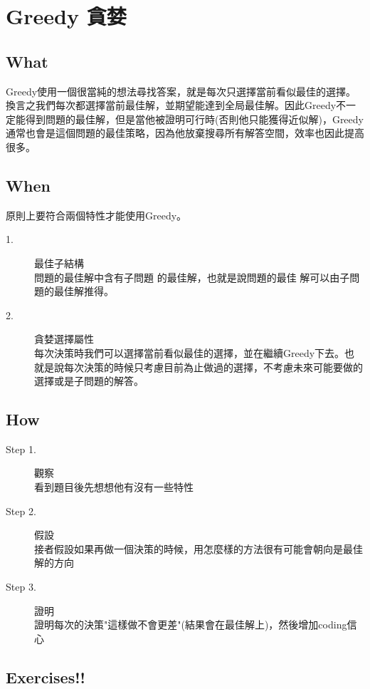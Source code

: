 \documentclass{article}
\begin{document}
\section{Greedy 貪婪}
\subsection{What}
Greedy使用一個很當純的想法尋找答案，就是每次只選擇當前看似最佳的選擇。換言之我們每次都選擇當前最佳解，並期望能達到全局最佳解。因此Greedy不一定能得到問題的最佳解，但是當他被證明可行時(否則他只能獲得近似解)，Greedy通常也會是這個問題的最佳策略，因為他放棄搜尋所有解答空間，效率也因此提高很多。


\subsection{When}
原則上要符合兩個特性才能使用Greedy。
\begin{description}
\item[ 1.]最佳子結構\\
問題的最佳解中含有子問題 的最佳解，也就是說問題的最佳 解可以由子問題的最佳解推得。
\item[ 2.]貪婪選擇屬性\\
每次決策時我們可以選擇當前看似最佳的選擇，並在繼續Greedy下去。也就是說每次決策的時候只考慮目前為止做過的選擇，不考慮未來可能要做的選擇或是子問題的解答。
\end{description}


\subsection{How}
\begin{description}
\item[ Step 1.]觀察\\看到題目後先想想他有沒有一些特性
\item[ Step 2.]假設\\接者假設如果再做一個決策的時候，用怎麼樣的方法很有可能會朝向是最佳解的方向
\item[ Step 3.]證明\\證明每次的決策"這樣做不會更差"(結果會在最佳解上)，然後增加coding信心
\end{description}


\subsection{Exercises!!}
\end{document}
